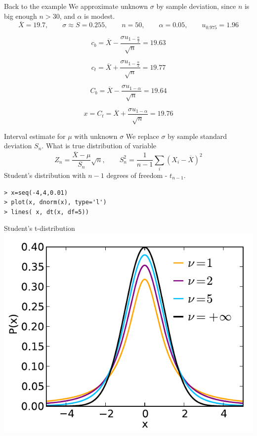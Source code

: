 \documentclass[smaller]{beamer}
\def\ol#1{\overline{#1}}
\def\df#1{{\usebeamercolor[fg]{my orange} #1}}
\def\xskip{{\vspace{2ex}}}
\begin{document}
\begin{frame}{Back to the example}
We approximate unknown $\sigma$ by sample deviation, since $n$ is big enough $n>30$, and $\alpha$ is modest.
\[
  \ol{X} = 19.7, \qquad \sigma \approx S =  0.255, \qquad n=50, \qquad \alpha=0.05,\qquad  u_{0.975} = 1.96
\]

\[
  c_b = \ol{X} - \frac{\sigma u_{1-\frac{\alpha}{2}}}{\sqrt{n}} = 19.63
\]

\[
  c_t = \ol{X} + \frac{\sigma u_{1-\frac{\alpha}{2}}}{\sqrt{n}} = 19.77
\]

\[
  C_b = \ol{X} - \frac{\sigma u_{1-\alpha}}{\sqrt{n}} = 19.64
\]

\[
  x= C_t = \ol{X} + \frac{\sigma u_{1-\alpha}}{\sqrt{n}} = 19.76
\]


\end{frame}
  
  
\begin{frame}[fragile]{Interval estimate for $\mu$ with unknown $\sigma$}
 We replace $\sigma$ by sample standard deviation $S_n$. What is true distribution of variable 
 \[
    Z_n = \frac{\ol{X} - \mu}{S_n} \sqrt{n}, \qquad S_n^2=\frac{1}{n-1} \sum_i (X_i - \ol{X})^2
 \]
 \df{Student's distribution} with $n-1$ degrees of freedom - $t_{n-1}$.
 
 \xskip
 \verb#> x=seq(-4,4,0.01)#\\
 \verb#> plot(x, dnorm(x), type='l')#\\
 \verb#> lines( x, dt(x, df=5))#
\end{frame}	

\begin{frame}{Student's t-distribution}
 \includegraphics[scale=0.8]{07_Student_t.pdf}
\end{frame}
\end{document}

